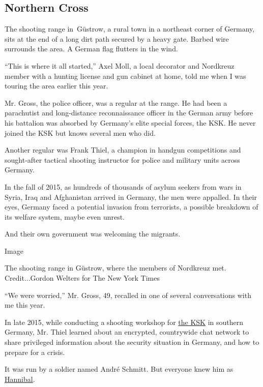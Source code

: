 \hypertarget{northern-cross}{%
\subsection{Northern Cross}\label{northern-cross}}

The shooting range in~Güstrow, a rural town in a northeast corner of
Germany, sits at the end of a long dirt path secured by a heavy gate.
Barbed wire surrounds the area. A German flag flutters in the wind.

``This is where it all started,'' Axel Moll, a local decorator and
Nordkreuz member with a hunting license and gun cabinet at home, told me
when I was touring the area earlier this year.

Mr. Gross, the police officer, was a regular at the range. He had been a
parachutist and long-distance reconnaissance officer in the German army
before his battalion was absorbed by Germany's elite special forces, the
KSK. He never joined the KSK but knows several men who did.

Another regular was Frank Thiel, a champion in handgun competitions and
sought-after tactical shooting instructor for police and military units
across Germany.

In the fall of 2015, as hundreds of thousands of asylum seekers from
wars in Syria, Iraq and Afghanistan arrived in Germany, the men were
appalled. In their eyes, Germany faced a potential invasion from
terrorists, a possible breakdown of its welfare system, maybe even
unrest.

And their own government was welcoming the migrants.

Image

The shooting range in Güstrow, where the members of Nordkreuz met.
Credit...Gordon Welters for The New York Times

``We were worried,'' Mr. Gross, 49, recalled in one of several
conversations with me this year.

In late 2015, while conducting a shooting workshop for
\href{https://www.nytimes.com/2020/07/03/world/europe/germany-military-neo-nazis-ksk.html?searchResultPosition=2}{the
KSK} in southern Germany, Mr. Thiel learned about an encrypted,
countrywide chat network to share privileged information about the
security situation in Germany, and how to prepare for a crisis.

It was run by a soldier named André Schmitt. But everyone knew him as
\href{https://www.nytimes.com/2020/07/03/world/europe/germany-military-neo-nazis-ksk.html?searchResultPosition=1}{Hannibal}.

